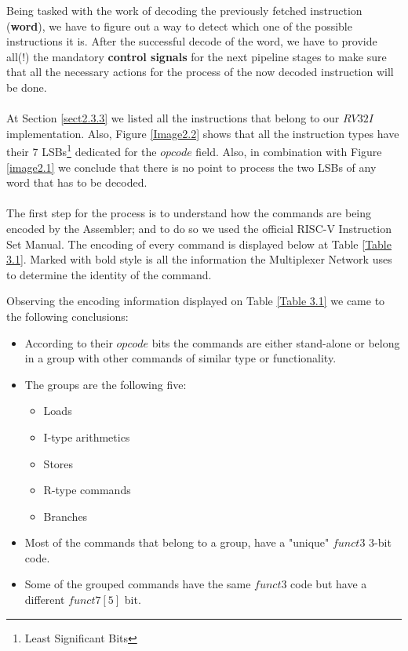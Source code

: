  	Being tasked with the work of decoding the previously fetched instruction (\textbf{word}), we have to figure out a way to detect which one of the possible instructions it is. After the successful decode of the word, we have to provide all(!) the mandatory \textbf{control signals} for the next pipeline stages to make sure that all the necessary actions for the process of the now decoded instruction will be done.\\\\ At Section \ref{sect2.3.3} we listed all the instructions that belong to our $RV32I$ implementation. Also, Figure \ref{Image2.2} shows that all the instruction types have their 7 LSBs\footnote{Least Significant Bits} dedicated for the $opcode$ field. Also, in combination with Figure \ref{image2.1} we conclude that there is no point to process the two LSBs of any word that has to be decoded.\\\\
 	The first step for the process is to understand how the commands are being encoded by the Assembler; and to do so we used the official RISC-V Instruction Set Manual. The encoding of every command is displayed below at Table \ref{Table 3.1}. Marked with bold style is all the information the Multiplexer Network uses to determine the identity of the command.
 	
 	Observing the encoding information displayed on Table \ref{Table 3.1} we came to the following conclusions:
 	\begin{itemize}
 		\item According to their $opcode$ bits the commands are either stand-alone or belong in a group with other commands of similar type or functionality.
 		\item The groups are the following five:
 		\begin{itemize}
 			\item Loads
 			\item I-type arithmetics
 			\item Stores
 			\item R-type commands
 			\item Branches
 		\end{itemize}
 		\item Most of the commands that belong to a group, have a "unique" $funct3$ 3-bit code. 
 		\item Some of the grouped commands have the same $funct3$ code but have a different $funct7[5]$ bit.
 	\end{itemize}	
 	\vspace{2mm}
 	
